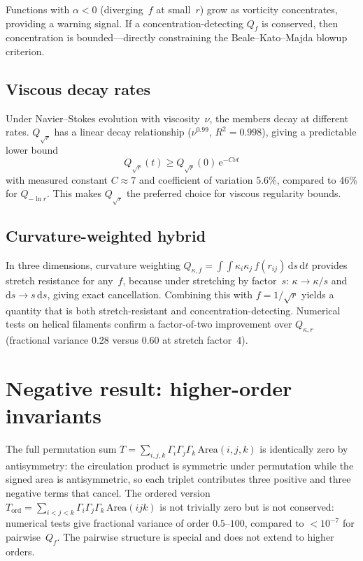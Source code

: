 \documentclass[rapids]{jfm}
\begin{document}
Functions with $\alpha < 0$ (diverging~$f$ at small~$r$) grow as vorticity concentrates, providing a warning signal. If a concentration-detecting $Q_f$ is conserved, then concentration is bounded---directly constraining the Beale--Kato--Majda blowup criterion.

\subsection{Viscous decay rates}

Under Navier--Stokes evolution with viscosity~$\nu$, the members decay at different rates. $Q_{\sqrt{r}}$ has a linear decay relationship ($\nu^{0.99}$, $R^2 = 0.998$), giving a predictable lower bound
\begin{equation}
Q_{\sqrt{r}}(t) \geq Q_{\sqrt{r}}(0)\,\mathrm{e}^{-C\nu t}
\end{equation}
with measured constant $C \approx 7$ and coefficient of variation 5.6\%, compared to 46\% for $Q_{-\ln r}$. This makes $Q_{\sqrt{r}}$ the preferred choice for viscous regularity bounds.

\subsection{Curvature-weighted hybrid}

In three dimensions, curvature weighting $Q_{\kappa,f} = \int\!\!\int \kappa_i \kappa_j\, f(r_{ij})\,\mathrm{d}s\,\mathrm{d}t$ provides stretch resistance for any~$f$, because under stretching by factor~$s$: $\kappa \to \kappa/s$ and $\mathrm{d}s \to s\,\mathrm{d}s$, giving exact cancellation. Combining this with $f = 1/\sqrt{r}$ yields a quantity that is both stretch-resistant and concentration-detecting. Numerical tests on helical filaments confirm a factor-of-two improvement over $Q_{\kappa,r}$ (fractional variance 0.28 versus 0.60 at stretch factor~4).

\section{Negative result: higher-order invariants}

The full permutation sum $T = \sum_{i,j,k} \Gamma_i \Gamma_j \Gamma_k\,\mathrm{Area}(i,j,k)$ is identically zero by antisymmetry: the circulation product is symmetric under permutation while the signed area is antisymmetric, so each triplet contributes three positive and three negative terms that cancel. The ordered version $T_\mathrm{ord} = \sum_{i<j<k} \Gamma_i \Gamma_j \Gamma_k\,\mathrm{Area}(ijk)$ is not trivially zero but is not conserved: numerical tests give fractional variance of order $0.5$--$100$, compared to $< 10^{-7}$ for pairwise~$Q_f$. The pairwise structure is special and does not extend to higher orders.
\end{document}
